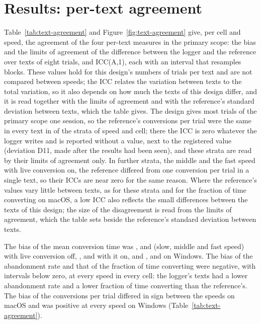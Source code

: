 
\section{Results: per-text agreement}
\label{sec:results-text}

Table~\ref{tab:text-agreement} and Figure~\ref{fig:text-agreement} give, per cell and speed, the agreement of the four
per-text measures in the primary scope: the bias and the limits of agreement of the difference between the logger and
the reference over texts of eight trials, and ICC(A,1), each with an interval that resamples blocks. These values hold
for this design's numbers of trials per text and are not compared between speeds; the ICC relates the variation between
texts to the total variation, so it also depends on how much the texts of this design differ, and it is read together
with the limits of agreement and with the reference's standard deviation between texts, which the table gives. The
design gives most trials of the primary scope one session, so the reference's conversions per trial were the same in
every text in  of the  strata
of speed and cell; there the ICC is zero whatever the logger writes and is reported without a value, next to the
registered value (deviation D11, made after the results had been seen), and these strata are read by their limits of
agreement only. In  further strata, the middle and the fast speed with
live conversion on, the reference differed from one conversion per trial in a single text, so their ICCs are near zero
for the same reason. Where the reference's values vary little between texts, as for these strata and for the fraction of time
converting on macOS, a low ICC also reflects the small differences between the texts of this design; the size of the
disagreement is read from the limits of agreement, which the table sets beside the reference's standard deviation
between texts.

The bias of the mean conversion time was ,
 and 
(slow, middle and fast speed) with live conversion off, ,
 and  with
it on, and ,  and
 on Windows. The bias of the abandonment rate and that of the
fraction of time converting were negative, with intervals below zero, at every speed in every cell: the logger's texts
had a lower abandonment rate and a lower fraction of time converting than the reference's. The bias of the conversions
per trial differed in sign between the speeds on macOS and was positive at every speed on Windows
(Table~\ref{tab:text-agreement}).

